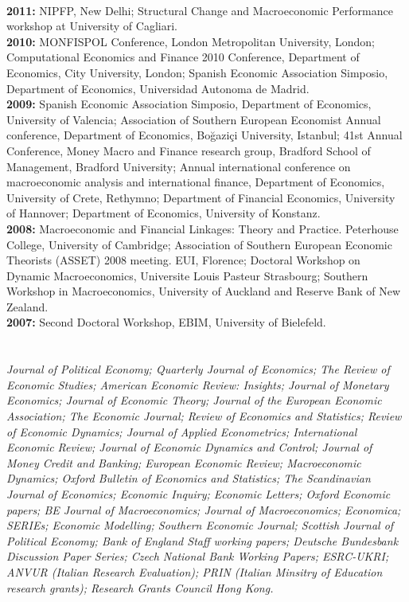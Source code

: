 \documentclass[margin, 11pt]{res} %
\begin{document}
\begin{resume}
\\
\textbf{2011:} {NIPFP, New Delhi; Structural Change and Macroeconomic Performance workshop at University of 
Cagliari.}
\\
\textbf{2010:} {MONFISPOL Conference, London Metropolitan University, London; Computational Economics and Finance 2010 Conference, Department of Economics,  City University, London; Spanish Economic Association Simposio, Department of Economics,  Universidad Autonoma de Madrid. }
\\
\textbf{2009:} {Spanish Economic Association Simposio, Department of Economics,  University of Valencia; Association of Southern European Economist Annual conference, Department of Economics, Bo\u{g}azi\c{c}i University, Istanbul; 41st Annual Conference, Money Macro and Finance research group, Bradford School of Management, Bradford University; Annual international conference on macroeconomic analysis and international finance, Department of Economics, University of Crete, Rethymno; Department of Financial Economics, University of Hannover; Department of Economics, University of Konstanz.}
\\
\textbf{2008:} {Macroeconomic and Financial Linkages: Theory and Practice. Peterhouse College, University of Cambridge; Association of Southern European Economic Theorists (ASSET) 2008 meeting. EUI, Florence; Doctoral Workshop on Dynamic Macroeconomics, Universite Louis Pasteur Strasbourg; Southern Workshop in Macroeconomics, University of Auckland and Reserve Bank of New Zealand.}
\\
\textbf{2007:} {Second Doctoral Workshop, EBIM, University of Bielefeld.}


\section{}
\emph{Journal of Political Economy; Quarterly Journal of Economics; The Review of Economic Studies; American Economic Review: Insights; Journal of Monetary Economics; Journal of Economic Theory; Journal of the European Economic Association; The Economic Journal; Review of Economics and Statistics; Review of Economic Dynamics; Journal of Applied Econometrics; International Economic Review; Journal of Economic Dynamics and Control; Journal of Money Credit and Banking; European Economic Review; Macroeconomic Dynamics; Oxford Bulletin of Economics and Statistics; The Scandinavian Journal of Economics; Economic Inquiry; Economic Letters; Oxford Economic papers; BE Journal of Macroeconomics; Journal of Macroeconomics; Economica; SERIEs; Economic Modelling; Southern Economic Journal; Scottish Journal of Political Economy; Bank of England Staff working papers; Deutsche Bundesbank Discussion Paper Series; Czech National Bank Working Papers; ESRC-UKRI; ANVUR (Italian Research Evaluation); PRIN (Italian Minsitry of Education research grants);  Research Grants Council Hong Kong.}



\end{resume}
\end{document}
